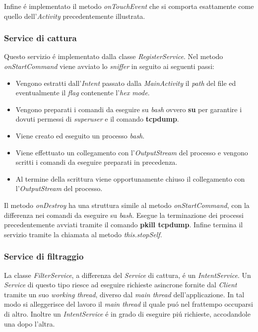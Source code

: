 \documentclass[12pt]{article} %
\begin{document}
Infine \'e implementato il metodo \textit{onTouchEvent} che si comporta esattamente come quello dell'\textit{Activity} precedentemente illustrata.

\subsubsection{Service di cattura}
Questo servizio \'e implementato dalla classe \textit{RegisterService}. Nel metodo \textit{onStartCommand} viene avviato lo \textit{sniffer} in seguito ai seguenti passi:

\begin{itemize}
\item Vengono estratti dall'\textit{Intent} passato dalla \textit{MainActivity} il \textit{path} del file ed eventualmente il \textit{flag} contenente l'\textit{hex mode}.
\item Vengono preparati i comandi da eseguire su \textit{bash} ovvero \textbf{su} per garantire i dovuti permessi di \textit{superuser} e il comando \textbf{tcpdump}.
\item Viene creato ed eseguito un processo \textit{bash}.
\item Viene effettuato un collegamento con l'\textit{OutputStream} del processo e vengono scritti i comandi da eseguire preparati in precedenza.
\item Al termine della scrittura viene opportunamente chiuso il collegamento con l'\textit{OutputStream} del processo.
\end{itemize}

Il metodo \textit{onDestroy} ha una struttura simile al metodo \textit{onStartCommand}, con la differenza nei comandi da eseguire su \textit{bash}. Esegue la terminazione dei processi precedentemente avviati tramite il comando \textbf{pkill tcpdump}. Infine termina il servizio tramite la chiamata al metodo \textit{this.stopSelf}. 

\subsubsection{Service di filtraggio}
La classe \textit{FilterService}, a differenza del \textit{Service} di cattura, \'e un \textit{IntentService}. Un \textit{Service} di questo tipo riesce ad eseguire richieste asincrone fornite dal \textit{Client} tramite un suo \textit{working thread}, diverso dal \textit{main thread} dell'applicazione. In tal modo si alleggerisce del lavoro il \textit{main thread} il quale pu\'o nel frattempo occuparsi di altro. Inoltre un \textit{IntentService} \'e in grado di eseguire pi\'u richieste, accodandole una dopo l'altra.
\end{document}
